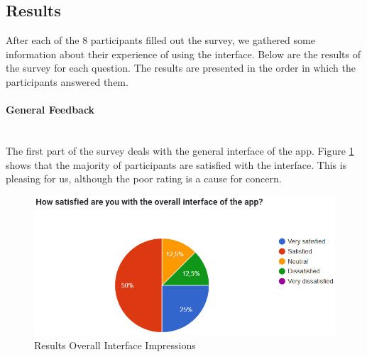 \documentclass[11pt]{article}
\begin{document}
\subsection{Results}
After each of the 8 participants filled out the survey, we gathered some information about their experience of using the interface. Below are the results of the survey for each question. The results are presented in the order in which the participants answered them.\\

\paragraph{General Feedback}\mbox{}\\
The first part of the survey deals with the general interface of the app. Figure \ref{fig:overall interface} shows that the majority of participants are satisfied with the interface. This is pleasing for us, although the poor rating is a cause for concern. 

\begin{figure}[h!]
    \centering
    \includegraphics[width=0.9\linewidth]{figures/overall Interface.PNG}
    \caption{Results Overall Interface Impressions}
    \label{fig:overall interface}
\end{figure}
\end{document}
